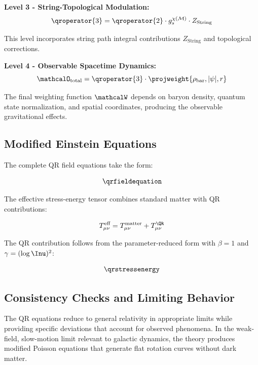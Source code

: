 \textbf{Level 3 - String-Topological Modulation:}
\begin{equation}
\qroperator{3} = \qroperator{2} \cdot g_s^{\chi(\mathcal{M})} \cdot Z_{\text{String}}
\label{eq:level3-operator}
\end{equation}

This level incorporates string path integral contributions $Z_{\text{String}}$ and topological corrections.

\textbf{Level 4 - Observable Spacetime Dynamics:}
\begin{equation}
\mathcalO_{\text{total}} = \qroperator{3} \cdot \projweight{\rho_{\text{bar}}, |\psi|, r}
\label{eq:total-operator}
\end{equation}

The final weighting function $\mathcalW$ depends on baryon density, quantum state normalization, and spatial coordinates, producing the observable gravitational effects.

\subsection{Modified Einstein Equations}
\label{subsec:modified-einstein}

The complete QR field equations take the form:

\begin{equation}
\qrfieldequation
\label{eq:modified-einstein}
\end{equation}

The effective stress-energy tensor combines standard matter with QR contributions:

\begin{equation}
T_{\mu\nu}^{\text{eff}} = T_{\mu\nu}^{\text{matter}} + T_{\mu\nu}^{\QR}
\label{eq:effective-stress-energy}
\end{equation}

The QR contribution follows from the parameter-reduced form with $\beta = 1$ and $\gamma = (\log \Inu)^2$:

\begin{equation}
\qrstressenergy
\label{eq:qr-stress-energy}
\end{equation}

\subsection{Consistency Checks and Limiting Behavior}
\label{subsec:consistency-checks}

The QR equations reduce to general relativity in appropriate limits while providing specific deviations that account for observed phenomena. In the weak-field, slow-motion limit relevant to galactic dynamics, the theory produces modified Poisson equations that generate flat rotation curves without dark matter.

